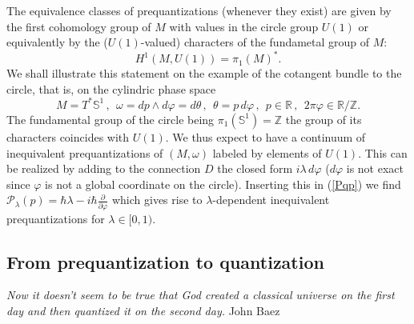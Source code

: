 \documentclass[12pt]{article}
\begin{document}
The equivalence classes of prequantizations (whenever they exist) are given by the first cohomology group
of $M$ with values in the circle group $U(1)$ or equivalently by the ($U(1)$-valued) characters of the
fundametal group of $M$:
\begin{equation}
\label{H1U1}
H^1(M, U(1)) = \pi_1(M)^*.
\end{equation}
We shall illustrate this statement on the example of the cotangent bundle to 
the circle, that is, on the cylindric phase space
\begin{equation}
\label{cyl}
M = T^*{\mathbb S}^1\,,\ \ \omega = dp\wedge d\varphi = d \theta\,, \ \
\theta = p\, d\varphi\,,\ \ p \in {\mathbb R}\,, \ \ 2 \pi\varphi \in 
\mathbb{R}/\mathbb{Z}.
\end{equation}
The fundamental group of the circle being $\pi_1({\mathbb S}^1) = \mathbb{Z}$ 
the group of its characters coincides with $U(1)$. We thus expect to have a 
continuum of inequivalent prequantizations of $(M, \omega)$
labeled by elements of $U(1)$. This can be realized by adding to the connection
 $D$ the closed form $i\lambda\,
d\varphi$   ($d\varphi$ is not exact since $\varphi$ is not a global coordinate on the circle). Inserting
this in (\ref{Pqp}) we find ${\mathcal P}_\lambda (p) = \hbar \lambda - i\hbar 
\frac{\partial}{\partial \varphi}$ which  gives rise to $\lambda$-dependent 
inequivalent prequantizations for $\lambda \in [0, 1)$.

\smallskip

\subsection{From prequantization to quantization}

\hfill\begin{minipage}{.7\linewidth}
{\it Now it doesn't seem to be true that God created a classical universe on the first day
and then quantized it on the second day.} 
John Baez \cite{B06}
\end{minipage}

\smallskip
\end{document}
